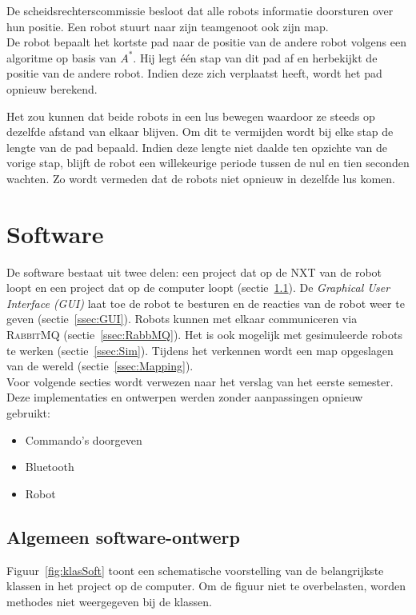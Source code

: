 \documentclass[eind]{penoverslag}
\begin{document}
De scheidsrechterscommissie besloot dat alle robots informatie doorsturen over hun positie. Een robot stuurt naar zijn teamgenoot ook zijn map.\\

De robot bepaalt het kortste pad naar de positie van de andere robot volgens een algoritme op basis van $A^{*}$. Hij legt \'e\'en stap van dit pad af en herbekijkt de positie van de andere robot. Indien deze zich verplaatst heeft, wordt het pad opnieuw berekend.

Het zou kunnen dat beide robots in een lus bewegen waardoor ze steeds op dezelfde afstand van elkaar blijven. Om dit te vermijden wordt bij elke stap de lengte van de pad bepaald. Indien deze lengte niet daalde ten opzichte van de vorige stap, blijft de robot een willekeurige periode tussen de nul en tien seconden wachten. Zo wordt vermeden dat de robots niet opnieuw in dezelfde lus komen.


\section{Software}
\label{sec:Softw}
De software bestaat uit twee delen: een project dat op de \textsc{NXT} van de robot loopt en een project dat op de computer loopt (sectie~\ref{ssec:Sdesign}). De \textit{Graphical User Interface (GUI)} laat toe de robot te besturen en de reacties van de robot weer te geven (sectie~\ref{ssec:GUI}). Robots kunnen met elkaar communiceren via \textsc{RabbitMQ} (sectie~\ref{ssec:RabbMQ}). Het is ook mogelijk met gesimuleerde robots te werken (sectie~\ref{ssec:Sim}). Tijdens het verkennen wordt een map opgeslagen van de wereld (sectie~\ref{ssec:Mapping}).\\

Voor volgende secties wordt verwezen naar het verslag van het eerste semester. Deze implementaties en ontwerpen werden zonder aanpassingen opnieuw gebruikt:

\begin{itemize}
\item Commando's doorgeven
\item Bluetooth
\item Robot
\end{itemize}

\subsection{Algemeen software-ontwerp}
\label{ssec:Sdesign}
Figuur~\ref{fig:klasSoft} toont een schematische voorstelling van de belangrijkste klassen in het project op de computer. Om de figuur niet te overbelasten, worden methodes niet weergegeven bij de klassen.\\
\end{document}
